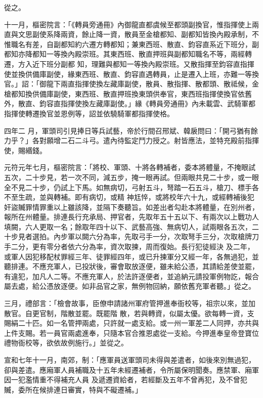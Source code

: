 \begin{pinyinscope}
 從之。



 十一月，樞密院言：「《轉員旁通冊》內御龍直都虞候至都頭副換官，惟指揮使上兩直與文思副使系降兩資，餘止降一資，散員至金槍都知、副都知皆換內殿承制，不惟職名有差，自副都知約六遷方轉都知；兼東西班、散直、鈞容直系近下班分，副都知亦降都知一等換內殿崇班。其東西班、散直押班與副都知職名不等，兩經轉遷，方入近下班分副都
 知，理難與都知一等換內殿崇班。又散指揮至鈞容直指揮使並換供備庫副使，緣東西班、散直、鈞容直遇轉員，止是遷入上班，亦難一等換官。」詔：「御龍下兩直指揮使換左藏庫副使，散員、散指揮、散都頭、散祗候，金槍都知換供備庫副使，東西班、散直押班換東頭供奉官，東西班指揮使換官依舊外，散直、鈞容直指揮使換左藏庫副使。」緣《轉員旁通冊》內未載雲、武騎軍都指揮使轉遷換官並恩例等，詔並依驍騎軍都指揮使格。



 四年二
 月，軍頭司引見捧日等兵試藝，帝於行間召邢斌、韓扆問曰：「開弓猶有餘力乎？」各對願增二石二斗弓。遣內待監定鬥力授之。射皆應法，並特充殿前指揮使，賜緡錢。



 元符元年七月，樞密院言：「將校、軍頭、十將各轉補者，委本將體量，不掩眼試五次，二十步見，若一次不同，減五步，掩一眼再試。但兩眼共見二十步，或一眼全不見二十步，仍試上下馬。如無病切，弓射五斗，弩踏一石五斗，槍刀、標手各不至生疏，並與轉補。即有病切，或精
 神尪悴，或將校年六十九，或經轉補後犯奸盜贓罪情罪重以上雖該降，並隔下奏聽旨。如差出者勾赴本將體量，在別州者，報所在州體量。排連長行充承局、押官者，先取年五十五以下、有兩次以上戰功人填闕，六人更取一名；餘取年四十以下、武藝高強、無病切人，試兩眼各五次，二十步見者選拍。內步軍以闕六分為率，先取弓手一分，次取弩手三分，次取槍牌刀手二分，更有零分者依六分為率，資次取揀，周而復始。長行犯徒經決
 及二年，或軍人因犯移配杖罪經三年、徒罪經四年，或已升揀軍分又經一年，各無過犯，並聽排連。不應充軍人，已投狀後，審會取放逐便，雖未給公憑，其請給差使並罷，有違犯，加凡人二等。不應充軍人，於法許逐便者，並追納元請投軍例物訖，報合屬去處，給公憑放逐便。如非品官之家，無例物回納，願依舊充軍者聽。」從之。



 三月，禮部言：「檢會故事，臣僚申請諸州軍府管押進奉衙校等，祖宗以來，並加散官。自更官制，階散並罷。既罷階
 散，若與轉資，似屬太優。欲每轉一資，支賜絹二十匹。如一名管押兩處，只許就一處支給。或一州一軍差二人同押，亦共與上件支賜。若一員官兩處進奉，只隨本官合推恩處從一支給。今押進奉皇帝登寶位禮物衙校等，欲依故例施行。」並從之。



 宣和七年十一月，南郊，制：「應軍員送軍頭司未得與差遣者，如後來別無過犯，卻與差遣。應廂軍人員補職及十五年未經遷補者，令所屬保明聞奏。應禁軍、廂軍因一犯濫情重不得補充人員
 及遞遷資給者，若經斷及五年不曾再犯，及不曾犯贓，委所在候排連日審實，特與不礙遷補。」




\end{pinyinscope}
